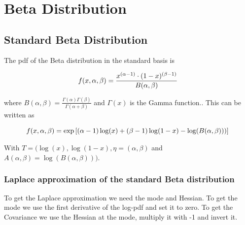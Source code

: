 \section{Beta Distribution}

\subsection{Standard Beta Distribution}

The pdf of the Beta distribution in the standard basis is

\begin{equation}
	f(x, \alpha, \beta) = \frac{x^{(\alpha - 1)} \cdot (1-x)^{(\beta-1)}}{B(\alpha, \beta)} \\
\end{equation}

where $B(\alpha, \beta) = \frac{\Gamma(\alpha)\Gamma(\beta)}{\Gamma(\alpha + \beta)}$ and $\Gamma(x)$ is the Gamma function.. This can be written as 

\begin{equation}
	f(x, \alpha, \beta) =  \exp\left[(\alpha-1) \log(x) + (\beta-1)\log(1-x) - \log(B(\alpha,\beta)))\right]\\
\end{equation}

With $T=(\log(x), \log(1-x), \eta = (\alpha, \beta)$ and $A(\alpha, \beta) = \log(B(\alpha,\beta)))$. 


\subsubsection{Laplace approximation of the standard Beta distribution}

To get the Laplace approximation we need the mode and Hessian. To get the mode we use the first derivative of the log-pdf and set it to zero. To get the Covariance we use the Hessian at the mode, multiply it with -1 and invert it. 

%
%
%
%	

